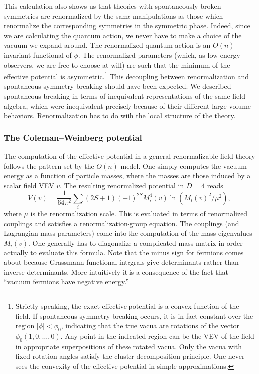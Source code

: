 This calculation also shows us that theories with spontaneously broken
symmetries are renormalized by the same manipulations as those which renormalize
the corresponding symmetries in the symmetric phase. Indeed, since we are
calculating the quantum action, we never have to make a choice of the vacuum we
expand around. The renormalized quantum action is an $O(n)$-invariant
functional of $\phi$. The renormalized parameters (which, as low-energy
observers, we are free to choose at will) are such that the minimum of the
effective potential is asymmetric.\footnote[21]{Strictly speaking, the exact
effective potential is a convex function of the field. If spontaneous symmetry
breaking occurs, it is in fact constant over the region $|\phi|<\phi_0$,
indicating that the true vacua are rotations of the vector $\phi_0(1,0,\ldots,0)$.
Any point in the indicated region can be the VEV of the field in appropriate
superpositions of these rotated vacua. Only the vacua with fixed rotation
angles satisfy the cluster-decomposition principle. One never sees the
convexity of the effective potential in simple approximations.} This decoupling
between renormalization and spontaneous symmetry breaking should have been
expected. We described spontaneous breaking in terms of inequivalent
representations of the same field algebra, which were inequivalent precisely
because of their different large-volume behaviors. Renormalization has to do
with the local structure of the theory.

\subsubsection{The Coleman--Weinberg potential}

The computation of the effective potential in a general renormalizable field
theory follows the pattern set by the $O(n)$ model. One simply computes the
vacuum energy as a function of particle masses, where the masses are those
induced by a scalar field VEV $v$. The resulting renormalized potential in $D=4$ reads
\[
  V(v)=\frac{1}{64\pi^2}\sum_i(2S+1)(-1)^{2S}M_i^4(v)
  \ln\!\left(M_i(v)^2/\mu^2\right),
\]
where $\mu$ is the renormalization scale. This is evaluated in terms of
renormalized couplings and satisfies a renormalization-group equation. The
couplings (and Lagrangian mass parameters) come into the computation of the
mass eigenvalues $M_i(v)$. One generally has to diagonalize a complicated mass
matrix in order actually to evaluate this formula. Note that the minus sign for
fermions comes about because Grassmann functional integrals give determinants
rather than inverse determinants. More intuitively it is a consequence of the
fact that ``vacuum fermions have negative energy.''

